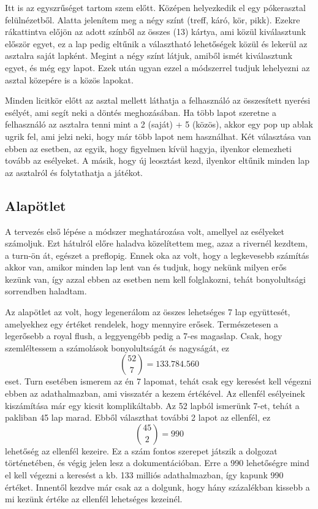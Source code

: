 Itt is az egyszrűséget tartom szem előtt. Középen helyezkedik el egy pókerasztal felülnézetből. Alatta jelenítem meg a négy színt (treff, káró, kör, pikk). Ezekre rákattintva előjön az adott színből az összes (13) kártya, ami közül kiválasztunk először egyet, ez a lap pedig eltűnik a választható lehetőségek közül és lekerül az asztalra saját lapként. Megint a négy színt látjuk, amiből ismét kiválasztunk egyet, és még egy lapot. Ezek után ugyan ezzel a módszerrel tudjuk lehelyezni az asztal közepére is a közös lapokat.

Minden licitkör előtt az asztal mellett láthatja a felhasználó az összesített nyerési esélyét, ami segít neki a döntés meghozásában. Ha több lapot szeretne a felhasználó az asztalra tenni mint a 2 (saját) + 5 (közös), akkor egy pop up ablak ugrik fel, ami jelzi neki, hogy már több lapot nem használhat. Két választása van ebben az esetben, az egyik, hogy figyelmen kívül hagyja, ilyenkor elemezheti tovább az esélyeket. A másik, hogy új leosztást kezd, ilyenkor eltűnik minden lap az asztalról és folytathatja a játékot.

\subsection{Alapötlet}
A tervezés első lépése a módszer meghatározása volt, amellyel az esélyeket számoljuk. Ezt hátulról előre haladva közelítettem meg, azaz a rivernél kezdtem, a turn-ön át, egészet a preflopig. Ennek oka az volt, hogy a legkevesebb számítás akkor van, amikor minden lap lent van és tudjuk, hogy nekünk milyen erős kezünk van, így azzal ebben az esetben nem kell folglakozni, tehát bonyolultsági sorrendben haladtam.

Az alapötlet az volt, hogy legenerálom az összes lehetséges 7 lap együttesét, amelyekhez egy értéket rendelek, hogy mennyire erősek. Természetesen a legerősebb a royal flush, a leggyengébb pedig a 7-es magaslap. Csak, hogy szemléltessem a számolások bonyolultságát és nagyságát, ez \[ \binom{52}{7}=133.784.560\] eset. Turn esetében ismerem az én 7 lapomat, tehát csak egy keresést kell végezni ebben az adathalmazban, ami visszatér a kezem értékével. Az ellenfél esélyeinek kiszámítása már egy kicsit komplikáltabb. Az 52 lapból ismerünk 7-et, tehát a pakliban 45 lap marad. Ebből választhat további 2 lapot az ellenfél, ez \[ \binom{45}{2}=990\] lehetőség az ellenfél kezeire. Ez a szám fontos szerepet játszik a dolgozat történetében, és végig jelen lesz a dokumentációban. Erre a 990 lehetőségre mind el kell végezni a keresést a kb. 133 milliós adathalmazban, így kapunk 990 értéket. Innentől kezdve már csak az a dolgunk, hogy hány százalékban kissebb a mi kezünk értéke az ellenfél lehetséges kezeinél. 


